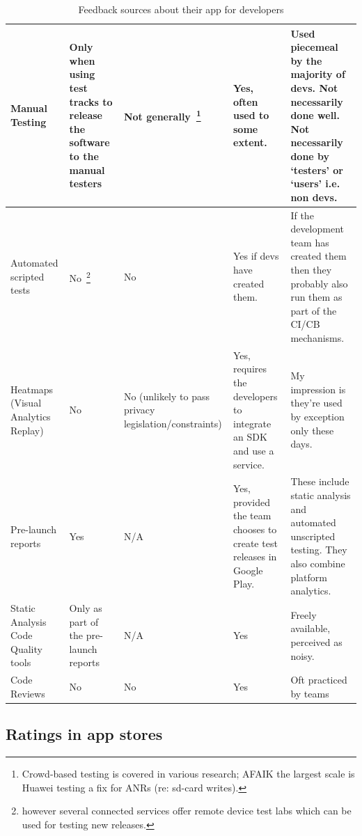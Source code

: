 \begin{table}[H]
\begin{tabular}{L{2cm} L{2.4cm} L{3.5cm} L{2.4cm} L{3.5cm}}
		Manual Testing & Only when using test tracks to release the software to the manual testers & Not generally~\footnote{Crowd-based testing is covered in various research; AFAIK the largest scale is Huawei testing a fix for ANRs (re: sd-card writes).} & Yes, often used to some extent. & Used piecemeal by the majority of devs. Not necessarily done well. Not necessarily done by ‘testers’ or ‘users’ i.e. non devs. \\ \midrule
		Automated scripted tests  & No~\footnote{however several connected services offer remote device test labs which can be used for testing new releases.} & No & Yes if devs have created them. & If the development team has created them then they probably also run them as part of the CI/CB mechanisms. \\ \midrule
		Heatmaps (Visual Analytics Replay) & No & No (unlikely to pass privacy legislation/constraints) & Yes, requires the developers to integrate an SDK and use a service. & My impression is they’re used by exception only these days. \\ \midrule
		Pre-launch reports & Yes & N/A & Yes, provided the team chooses to create test releases in Google Play. & These include static analysis and automated unscripted testing. They also combine platform analytics. \\ \midrule
		Static Analysis Code Quality tools & Only as part of the pre-launch reports & N/A & Yes & Freely available, perceived as noisy. \\ \midrule
		Code Reviews & No & No & Yes & Oft practiced by teams \\
		\bottomrule
	\end{tabular}
	\caption{Feedback sources about their app for developers}
	\label{tab:feedback-sources-about-their-app-for-devs}
\end{table}


\vspace{2\baselineskip}

\subsection{Ratings in app stores}


